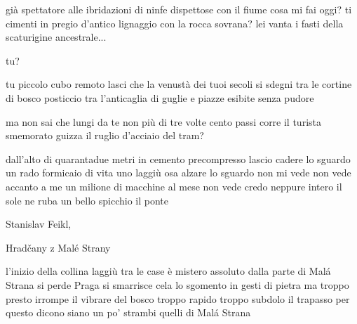 \begin{poem}
	\begin{stanza}
		già spettatore alle ibridazioni\verseline
		di ninfe dispettose con il fiume\verseline
		cosa mi fai oggi?\verseline
		ti cimenti in pregio d'antico lignaggio con la rocca sovrana?\verseline
		lei vanta i fasti della scaturigine ancestrale...
	\end{stanza}

	\begin{stanza}
		tu?
	\end{stanza}

	\begin{stanza}
		tu\verseline
		piccolo cubo remoto\verseline
		lasci che la venustà dei tuoi secoli\verseline
		si sdegni tra le cortine di bosco posticcio\verseline
		tra l’anticaglia di guglie e piazze\verseline
		esibite senza pudore
	\end{stanza}

	\begin{stanza}
		ma non sai che lungi da te non più di tre volte\verseline
		cento passi\verseline
		corre il turista smemorato\verseline
		guizza il ruglio d'acciaio del tram?
	\end{stanza}
\end{poem}

\clearpage


\begin{poem}
	\begin{stanza}
		dall'alto di quarantadue metri\verseline
		in cemento precompresso\verseline
		lascio cadere lo sguardo\verseline
		un rado formicaio di vita\verseline
		uno laggiù osa alzare lo sguardo\verseline
		non mi vede\verseline
		non vede accanto a me\verseline
		un milione di macchine al mese\verseline
		non vede credo neppure intero il sole\verseline
		ne ruba un bello spicchio il ponte
	\end{stanza}
\end{poem}

\clearpage


\begin{artItem}
	Stanislav Feikl, \begin{otherlanguage}{czech}%
		Hradčany z Malé Strany%
	\end{otherlanguage}
\end{artItem}

\begin{poem}
	\begin{stanza}
		l'inizio della collina\verseline
		laggiù tra le case\verseline
		è mistero assoluto\verseline
		dalla parte di Malá Strana\verseline
		si perde Praga\verseline
		si smarrisce\verseline
		cela lo sgomento in gesti di pietra\verseline
		ma troppo presto\verseline
		irrompe il vibrare del bosco\verseline
		troppo rapido troppo subdolo\verseline
		il trapasso\verseline
		per questo dicono siano un po' strambi\verseline
		quelli di Malá Strana
	\end{stanza}
\end{poem}

